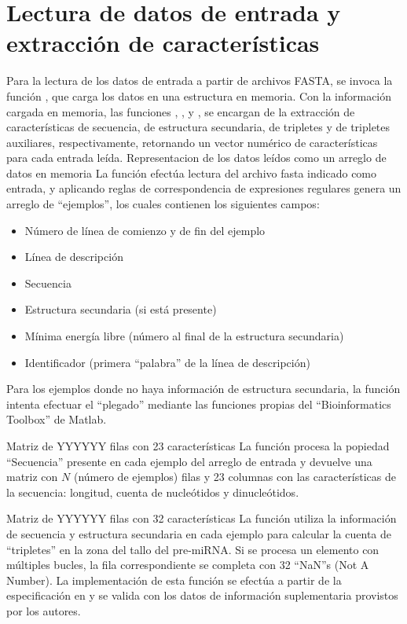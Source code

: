\section{Lectura de datos de entrada y extracción de características}

Para la lectura de los datos de entrada a partir de archivos FASTA, se
invoca la función , que carga los datos
en una estructura en memoria.
Con la información cargada en memoria, las funciones
, , 
y , se encargan de la extracción de
características de secuencia, de estructura secundaria, de tripletes y
de tripletes auxiliares, respectivamente, retornando un vector
numérico de características para cada entrada leída.
%
{Representacion de los datos leídos como un arreglo de datos en memoria}
La función  efectúa lectura del archivo fasta
indicado como entrada, y aplicando reglas de correspondencia de
expresiones regulares genera un arreglo de ``ejemplos'', los cuales
contienen los siguientes campos:

\begin{itemize}
\item Número de línea de comienzo y de fin del ejemplo
\item Línea de descripción
\item Secuencia
\item Estructura secundaria (si está presente)
\item Mínima energía libre (número al final de la estructura
  secundaria)
\item Identificador (primera ``palabra'' de la línea de descripción)
\end{itemize}
Para los ejemplos donde no haya información de estructura secundaria,
la función  intenta efectuar el ``plegado'' mediante
las funciones propias del ``Bioinformatics Toolbox'' de Matlab.

%
{Matriz de YYYYYY filas con 23 características}
La función  procesa la popiedad ``Secuencia''
presente en cada ejemplo del arreglo de entrada y devuelve una matriz
con $N$ (número de ejemplos) filas y 23 columnas con las características
de la secuencia: longitud, cuenta de nucleótidos y dinucleótidos.

%
{Matriz de YYYYYY filas con 32 características}
La función  utiliza la información de secuencia y
estructura secundaria en cada ejemplo para calcular la cuenta de
``tripletes'' en la zona del tallo del pre-miRNA.  Si se procesa un
elemento con múltiples bucles, la fila correspondiente se completa con
32 ``NaN''s (Not A Number).  La implementación de esta función se
efectúa a partir de la especificación en \cite{xue} y se valida con
los datos de información suplementaria provistos por los autores.

